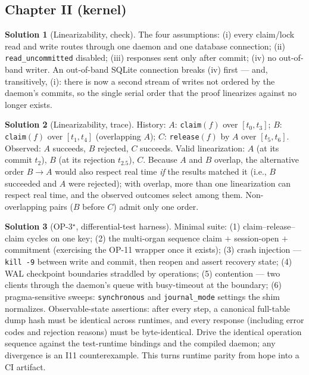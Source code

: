 \documentclass[11pt,a4paper]{article}
\theoremstyle{definition}
\newtheorem{sol}{Solution}
\theoremstyle{remark}
\begin{document}
\subsection{Chapter II (kernel)}

\begin{sol}[Linearizability, check]
The four assumptions: (i) every claim/lock read and write routes through one daemon and one database connection; (ii) \texttt{read\_uncommitted} disabled; (iii) responses sent only after commit; (iv) no out-of-band writer. An out-of-band SQLite connection breaks (iv) first --- and, transitively, (i): there is now a second stream of writes not ordered by the daemon's commits, so the single serial order that the proof linearizes against no longer exists.
\end{sol}

\begin{sol}[Linearizability, trace]
History: $A$: \texttt{claim}$(f)$ over $[t_0,t_3]$; $B$: \texttt{claim}$(f)$ over $[t_1,t_4]$ (overlapping $A$); $C$: \texttt{release}$(f)$ by $A$ over $[t_5,t_6]$. Observed: $A$ succeeds, $B$ rejected, $C$ succeeds. Valid linearization: $A$ (at its commit $t_2$), $B$ (at its rejection $t_{2.5}$), $C$. Because $A$ and $B$ overlap, the alternative order $B \to A$ would also respect real time \emph{if} the results matched it (i.e., $B$ succeeded and $A$ were rejected); with overlap, more than one linearization can respect real time, and the observed outcomes select among them. Non-overlapping pairs ($B$ before $C$) admit only one order.
\end{sol}

\begin{sol}[OP-3$^\star$, differential-test harness]
Minimal suite: (1) claim--release--claim cycles on one key; (2) the multi-organ sequence claim $+$ session-open $+$ commitment (exercising the OP-11 wrapper once it exists); (3) crash injection --- \texttt{kill -9} between write and commit, then reopen and assert recovery state; (4) WAL checkpoint boundaries straddled by operations; (5) contention --- two clients through the daemon's queue with busy-timeout at the boundary; (6) pragma-sensitive sweeps: \texttt{synchronous} and \texttt{journal\_mode} settings the shim normalizes. Observable-state assertions: after every step, a canonical full-table dump hash must be identical across runtimes, and every response (including error codes and rejection reasons) must be byte-identical. Drive the identical operation sequence against the test-runtime bindings and the compiled daemon; any divergence is an I11 counterexample. This turns runtime parity from hope into a CI artifact.
\end{sol}
\end{document}
